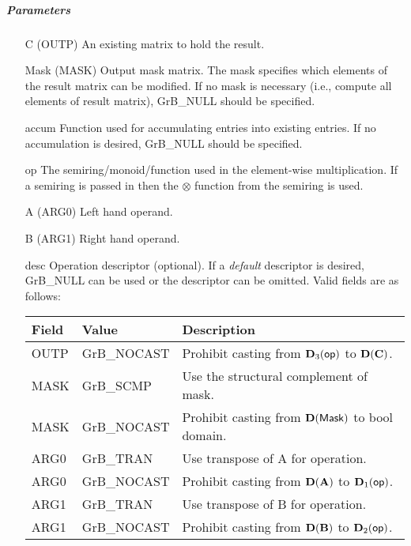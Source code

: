 \subparagraph{Parameters}

\begin{itemize}[leftmargin=1.1in]
    \item[{\sf C}]     ({\sf OUTP}) An existing matrix to hold the result.

    \item[{\sf Mask}] ({\sf MASK}) Output mask matrix. The mask
    specifies which elements of the result matrix can be modified.
    If no mask is necessary (i.e., compute all elements of result
    matrix), {\sf GrB\_NULL} should be specified.

    \item[{\sf accum}]  Function used for accumulating entries into existing
                         entries. If no accumulation is desired,
                        {\sf GrB\_NULL} should be specified.

    \item[{\sf op}]    The semiring/monoid/function used in the element-wise multiplication.
                       If a semiring is passed in then the $\otimes$ function from
                                    the semiring is used.
    \item[{\sf A}]     ({\sf ARG0}) Left hand operand.
    \item[{\sf B}]     ({\sf ARG1}) Right hand operand.
    
    \item[{\sf desc}]  Operation descriptor (optional). If a
    \emph{default} descriptor is desired, {\sf GrB\_NULL} can be
    used or the descriptor can be omitted. Valid fields are as follows: \\
    \begin{tabular}{lll}
        Field  & Value & Description \\
        \hline
        {\sf OUTP} & {\sf GrB\_NOCAST} & Prohibit casting from $\bold{D}_3({\sf op})$ to $\bold{D}({\bf C})$. \\
        {\sf MASK} & {\sf GrB\_SCMP} & Use the structural complement of {\sf mask}. \\
    {\sf MASK} & {\sf GrB\_NOCAST} & Prohibit casting from $\bold{D}({\sf Mask})$ to {\sf bool} domain. \\
    {\sf ARG0} & {\sf GrB\_TRAN} & Use transpose of {\sf A} for operation. \\
        {\sf ARG0} & {\sf GrB\_NOCAST} & Prohibit casting from $\bold{D}({\bf A})$ to $\bold{D}_1({\sf op})$. \\
    {\sf ARG1} & {\sf GrB\_TRAN} & Use transpose of {\sf B} for operation. \\
        {\sf ARG1} & {\sf GrB\_NOCAST} & Prohibit casting from $\bold{D}({\bf B})$ to $\bold{D}_2({\sf op})$. \\
    \end{tabular}
\end{itemize}

